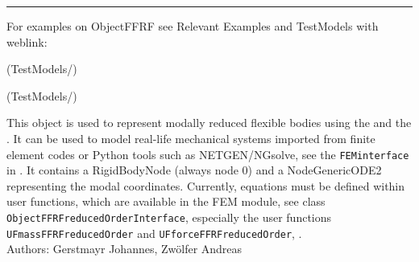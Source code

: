     \finishTable
    \vspace{12pt}
\vspace{6pt}\par\noindent\rule{\textwidth}{0.4pt}
%
\noindent For examples on ObjectFFRF see Relevant Examples and TestModels with weblink:
\bi
\item {} (TestModels/)
\item {} (TestModels/)

\ei

%
\newpage


\label{sec:item:ObjectFFRFreducedOrder}
This object is used to represent modally reduced flexible bodies using the  and the . It can be used to model real-life mechanical systems imported from finite element codes or Python tools such as NETGEN/NGsolve, see the \texttt{FEMinterface} in . It contains a RigidBodyNode (always node 0) and a NodeGenericODE2 representing the modal coordinates. Currently, equations must be defined within user functions, which are available in the FEM module, see class \texttt{ObjectFFRFreducedOrderInterface}, especially the user functions \texttt{UFmassFFRFreducedOrder} and \texttt{UFforceFFRFreducedOrder}, .
\vspace{12pt}\\

\noindent Authors: Gerstmayr Johannes, Zw\"olfer Andreas
\vspace{12pt}\\

